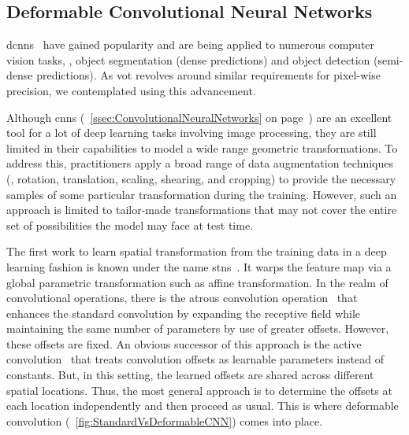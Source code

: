 \subsection{Deformable Convolutional Neural Networks}
\label{ssec:DeformableCNNs}

\glspl{dcnn}~\cite{dai2017dcnn} have gained popularity and are being applied to numerous computer vision tasks, \egtext{}, object segmentation (dense predictions) and object detection (semi-dense predictions). As \gls{vot} revolves around similar requirements for pixel-wise precision, we contemplated using this advancement.

Although \glspl{cnn} (\sectiontext{}~\ref{ssec:ConvolutionalNeuralNetworks} on page~\pageref{ssec:ConvolutionalNeuralNetworks}) are an excellent tool for a lot of deep learning tasks involving image processing, they are still limited in their capabilities to model a wide range geometric transformations. To address this, practitioners apply a broad range of data augmentation techniques (\egtext{}, rotation, translation, scaling, shearing, and cropping) to provide the necessary samples of some particular transformation during the training. However, such an approach is limited to tailor-made transformations that may not cover the entire set of possibilities the model may face at test time.

The first work to learn spatial transformation from the training data in a deep learning fashion is known under the name \glspl{stn}~\cite{jaderberg2016stn}. It warps the feature map via a global parametric transformation such as affine transformation. In the realm of convolutional operations, there is the atrous convolution operation~\cite{holschneider1990atrousconv} that enhances the standard convolution by expanding the receptive field while maintaining the same number of parameters by use of greater offsets. However, these offsets are fixed. An obvious successor of this approach is the active convolution~\cite{jeon2017activeconv} that treats convolution offsets as learnable parameters instead of constants. But, in this setting, the learned offsets are shared across different spatial locations. Thus, the most general approach is to determine the offsets at each location independently and then proceed as usual. This is where deformable convolution (\figtext{}~\ref{fig:StandardVsDeformableCNN}) comes into place.

